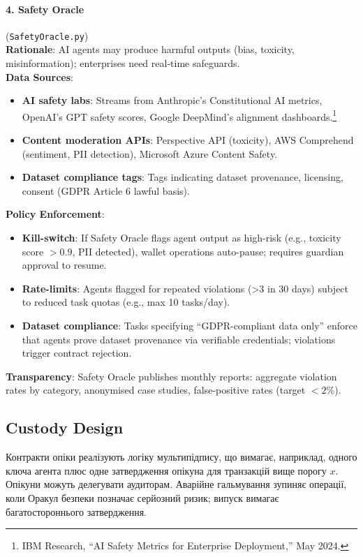 \documentclass[11pt]{article}
\begin{document}
\paragraph{4. Safety Oracle} (\texttt{SafetyOracle.py})\\
\textbf{Rationale}: AI agents may produce harmful outputs (bias, toxicity, misinformation); enterprises need real-time safeguards.\\
\textbf{Data Sources}:
\begin{itemize}[noitemsep]
  \item \textbf{AI safety labs}: Streams from Anthropic's Constitutional AI metrics, OpenAI's GPT safety scores, Google DeepMind's alignment dashboards.\footnote{IBM Research, ``AI Safety Metrics for Enterprise Deployment,'' May 2024.}
  \item \textbf{Content moderation APIs}: Perspective API (toxicity), AWS Comprehend (sentiment, PII detection), Microsoft Azure Content Safety.
  \item \textbf{Dataset compliance tags}: Tags indicating dataset provenance, licensing, consent (GDPR Article 6 lawful basis).
\end{itemize}
\textbf{Policy Enforcement}:
\begin{itemize}[noitemsep]
  \item \textbf{Kill-switch}: If Safety Oracle flags agent output as high-risk (e.g., toxicity score $>0.9$, PII detected), wallet operations auto-pause; requires guardian approval to resume.
  \item \textbf{Rate-limits}: Agents flagged for repeated violations (>3 in 30 days) subject to reduced task quotas (e.g., max 10 tasks/day).
  \item \textbf{Dataset compliance}: Tasks specifying ``GDPR-compliant data only'' enforce that agents prove dataset provenance via verifiable credentials; violations trigger contract rejection.
\end{itemize}
\textbf{Transparency}: Safety Oracle publishes monthly reports: aggregate violation rates by category, anonymised case studies, false-positive rates (target $<2\%$).

\subsection{Custody Design}
Контракти опіки реалізують логіку мультипідпису, що вимагає, наприклад, одного ключа агента плюс одне затвердження опікуна для транзакцій вище порогу $x$. Опікуни можуть делегувати аудиторам. Аварійне гальмування зупиняє операції, коли Оракул безпеки позначає серйозний ризик; випуск вимагає багатостороннього затвердження.
\end{document}
